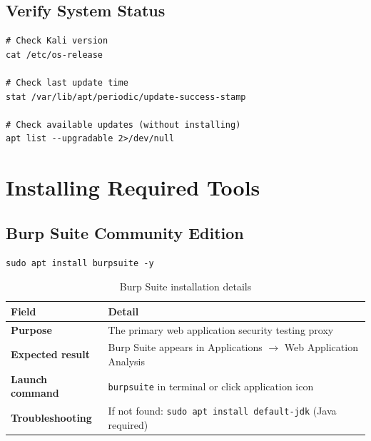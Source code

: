 
\subsection{Verify System Status}

\begin{lstlisting}[style=terminal, caption={Check system is up to date}]
# Check Kali version
cat /etc/os-release

# Check last update time
stat /var/lib/apt/periodic/update-success-stamp

# Check available updates (without installing)
apt list --upgradable 2>/dev/null
\end{lstlisting}

\section{Installing Required Tools}

\subsection{Burp Suite Community Edition}

\begin{lstlisting}[style=terminal, caption={Install Burp Suite on Kali}]
sudo apt install burpsuite -y
\end{lstlisting}

\begin{table}[H]
\centering
\caption{Burp Suite installation details}
\begin{tabularx}{\textwidth}{>{\bfseries}lX}
\toprule
Field & Detail \\
\midrule
Purpose & The primary web application security testing proxy \\
Expected result & Burp Suite appears in Applications $\to$ Web Application Analysis \\
Launch command & \texttt{burpsuite} in terminal or click application icon \\
Troubleshooting & If not found: \texttt{sudo apt install default-jdk} (Java required) \\
\bottomrule
\end{tabularx}
\end{table}


